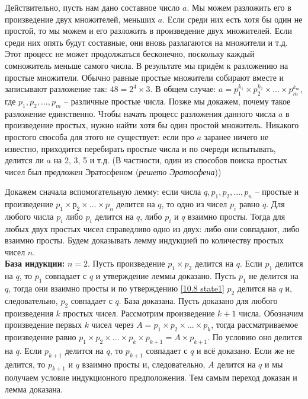 \noindent Действительно, пусть нам дано составное число $a$. Мы можем разложить его в произведение двух множителей, меньших $a$. Если среди них есть хотя бы один не простой, то мы можем и его разложить в произведение двух множителей. Если среди них опять будут составные, они вновь разлагаются на множители и т.д. Этот процесс не может продолжаться бесконечно, поскольку каждый сомножитель меньше самого числа. В результате мы придём к разложению на простые множители. Обычно равные простые множители собирают вместе и записывают разложение так: $48 = 2^4 \times 3$. В общем случае: $a = p_1^{k_1} \times p_2^{k_2} \times ... \times p_m^{k_m}$, где $p_1, p_2, ..., p_m$ -- различные простые числа. Позже мы докажем, почему такое разложение единственно.
Чтобы начать процесс разложения данного числа $a$ в произведение простых, нужно найти хотя бы один простой множитель. Никакого простого способа для этого не существует: если про $a$ заранее ничего не известно, приходится перебирать простые числа и по очереди испытывать, делится ли $a$ на 2, 3, 5 и т.д. (В частности, один из способов поиска простых чисел был предложен Эратосфеном (\textit{решето Эратосфена}))

\begin{center}
\end{center}

\begin{dok}
    Докажем сначала вспомогательную лемму: если числа $q, p_1, p_2, ..., p_n$ -- простые и произведение $p_1 \times р_2 \times ... \times p_n$ делится на $q$, то одно из чисел $p_i$ равно $q$. Для любого числа $p_i$ либо $p_i$ делится на $q$, либо $p_i$ и $q$ взаимно просты. Тогда для любых двух простых чисел справедливо одно из двух: либо они совпадают, либо взаимно просты. Будем доказывать лемму индукцией по количеству простых чисел $n$. 
    \\
    \textbf{База индукции:} $n = 2$. Пусть произведение $p_1 \times p_2$ делится на $q$. Если $p_1$ делится на $q$, то $p_1$ совпадает с $q$ и утверждение леммы доказано. Пусть $p_1$ не делится на $q$, тогда они взаимно просты и по утверждению \ref{10.8 state1} $p_2$ делится на $q$ и, следовательно, $p_2$ совпадает с $q$. База доказана. Пусть доказано для любого произведения $k$ простых чисел. Рассмотрим произведение $k + 1$ числа. Обозначим произведение первых $k$ чисел через $A = p_1 \times p_2 \times ... \times p_k$, тогда рассматриваемое произведение равно $p_1 \times p_2 \times ... \times p_k \times p_{k + 1} = A \times p_{k + 1}$. По условию оно делится на $q$. Если $p_{k + 1}$ делится на $q$, то $p_{k + 1}$ совпадает с $q$ и всё доказано. Если же не делится, то $p_{k + 1}$ и $q$ взаимно просты и, следовательно, $A$ делится на $q$ и мы получаем условие индукционного предположения. Тем самым переход доказан и лемма доказана.
\end{dok}

